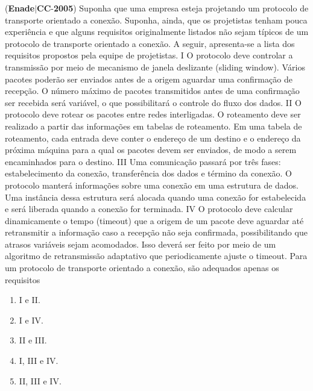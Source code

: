 \documentclass{exam}
\begin{document}
\begin{questions}
\question (\textbf{Enade}$|$\textbf{CC}-\textbf{2005}) Suponha que uma empresa esteja projetando um protocolo de
transporte orientado a conexão. Suponha, ainda, que os projetistas
tenham pouca experiência e que alguns requisitos originalmente
listados não sejam típicos de um protocolo de transporte
orientado a conexão. A seguir, apresenta-se a lista dos
requisitos propostos pela equipe de projetistas.
I O protocolo deve controlar a transmissão por meio de
mecanismo de janela deslizante (sliding window). Vários
pacotes poderão ser enviados antes de a origem aguardar uma
confirmação de recepção. O número máximo de pacotes
transmitidos antes de uma confirmação ser recebida será
variável, o que possibilitará o controle do fluxo dos dados.
II O protocolo deve rotear os pacotes entre redes interligadas.
O roteamento deve ser realizado a partir das informações em
tabelas de roteamento. Em uma tabela de roteamento, cada
entrada deve conter o endereço de um destino e o endereço da
próxima máquina para a qual os pacotes devem ser enviados,
de modo a serem encaminhados para o destino.
III Uma comunicação passará por três fases: estabelecimento da
conexão, transferência dos dados e término da conexão. O
protocolo manterá informações sobre uma conexão em uma
estrutura de dados. Uma instância dessa estrutura será alocada
quando uma conexão for estabelecida e será liberada quando
a conexão for terminada.
IV O protocolo deve calcular dinamicamente o tempo (timeout)
que a origem de um pacote deve aguardar até retransmitir a
informação caso a recepção não seja confirmada,
possibilitando que atrasos variáveis sejam acomodados. Isso
deverá ser feito por meio de um algoritmo de retransmissão
adaptativo que periodicamente ajuste o timeout.
Para um protocolo de transporte orientado a conexão, são
adequados apenas os requisitos
	\begin{enumerate}[label=\alph*)]
		\item  I e II.
		\item  I e IV.
		\item  II e III.
		\item  I, III e IV.
		\item  II, III e IV.

	\end{enumerate}


\end{questions}
\end{document}
